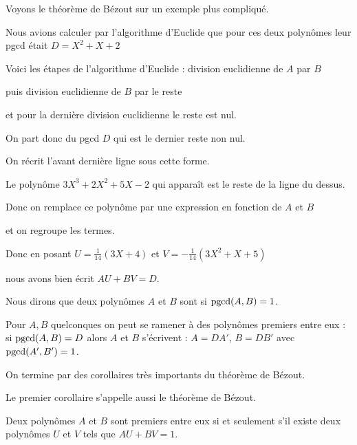 \diapo

Voyons le théorème de Bézout sur un exemple plus compliqué.

Nous avions calculer par l'algorithme d'Euclide que 
pour ces deux polynômes leur pgcd était $D=X^2+X+2$

\change

Voici les étapes de l'algorithme d'Euclide :
division euclidienne de $A$ par $B$

puis division euclidienne de $B$ par le reste

et pour la dernière division euclidienne le reste est nul.



\change

On part donc du pgcd $D$ qui est le dernier reste non nul.

On récrit l'avant dernière ligne sous cette forme.

Le polynôme $3X^3+2X^2+5X-2$ qui apparaît est le reste de la ligne du dessus.

\change


Donc on remplace ce polynôme par une expression en fonction de $A$ et $B$ 

\change

et on regroupe les termes.


\change

Donc en posant $U=\frac{1}{14}(3X+4)$ et $V=-\frac{1}{14}(3X^2+X+5)$

\change

nous avons bien écrit $AU+BV=D$.

\diapo

Nous dirons que deux polynômes $A$ et $ B$ sont  si  $\mathop{\mathrm{pgcd}}\nolimits(A,B)=1$.

\change

Pour $A,B$ quelconques on peut se ramener à des polynômes premiers entre eux :
si  $\mathop{\mathrm{pgcd}}\nolimits(A,B)=D$ alors $A$ et $B$ s'écrivent : $A=DA'$, $B=DB'$ avec $\mathop{\mathrm{pgcd}}\nolimits(A',B')=1$.




\diapo

On termine par des corollaires très importants du théorème de Bézout.

Le premier corollaire s'appelle aussi le théorème de Bézout.


Deux polynômes $A$ et $B$ sont premiers entre eux si
et seulement s'il existe deux polynômes $U$ et $V$ tels que $AU+BV=1$.

